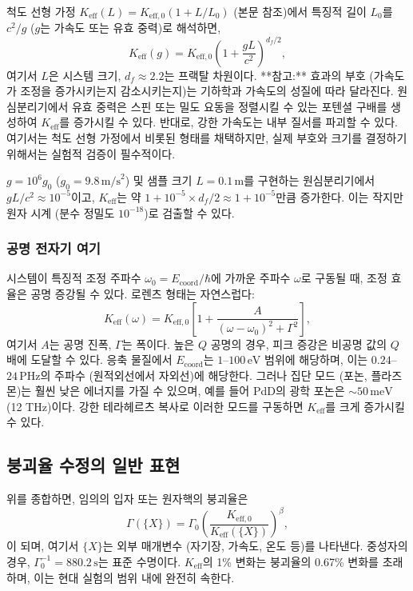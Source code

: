 \documentclass[11pt,a4paper]{article}
\theoremstyle{remark}
\newcommand{\Keff}{K_{\mathrm{eff}}}
\newcommand{\Keffzero}{K_{\mathrm{eff},0}}
\newcommand{\df}{d_{\!f}}
\begin{document}
	척도 선형 가정 \(\Keff(L) = \Keffzero (1 + L/L_0)\) (본문 참조)에서 특징적 길이 \(L_0\)를 \(c^2/g\) (\(g\)는 가속도 또는 유효 중력)로 해석하면,
	\begin{equation}
		\Keff(g) = \Keffzero \left(1 + \frac{gL}{c^2}\right)^{\df/2},
		\label{eq:keff-g}
	\end{equation}
	여기서 \(L\)은 시스템 크기, \(\df \approx 2.2\)는 프랙탈 차원이다. **참고:** 효과의 부호 (가속도가 조정을 증가시키는지 감소시키는지)는 기하학과 가속도의 성질에 따라 달라진다. 원심분리기에서 유효 중력은 스핀 또는 밀도 요동을 정렬시킬 수 있는 포텐셜 구배를 생성하여 \(\Keff\)를 증가시킬 수 있다. 반대로, 강한 가속도는 내부 질서를 파괴할 수 있다. 여기서는 척도 선형 가정에서 비롯된 형태를 채택하지만, 실제 부호와 크기를 결정하기 위해서는 실험적 검증이 필수적이다.
	
	\(g = 10^6g_0\) (\(g_0 = 9.8\,\text{m/s}^2\)) 및 샘플 크기 \(L = 0.1\,\text{m}\)를 구현하는 원심분리기에서 \(gL/c^2 \approx 10^{-5}\)이고, \(\Keff\)는 약 \(1 + 10^{-5}\times\df/2 \approx 1 + 10^{-5}\)만큼 증가한다. 이는 작지만 원자 시계 (분수 정밀도 \(10^{-18}\))로 검출할 수 있다.
	
	\subsubsection{공명 전자기 여기}
	
	시스템이 특징적 조정 주파수 \(\omega_0 = E_{\mathrm{coord}}/\hbar\)에 가까운 주파수 \(\omega\)로 구동될 때, 조정 효율은 공명 증강될 수 있다. 로렌츠 형태는 자연스럽다:
	\begin{equation}
		\Keff(\omega) = \Keffzero \left[ 1 + \frac{A}{(\omega - \omega_0)^2 + \Gamma^2} \right],
		\label{eq:keff-omega}
	\end{equation}
	여기서 \(A\)는 공명 진폭, \(\Gamma\)는 폭이다. 높은 \(Q\) 공명의 경우, 피크 증강은 비공명 값의 \(Q\) 배에 도달할 수 있다. 응축 물질에서 \(E_{\mathrm{coord}}\)는 \(1\)–\(100\,\text{eV}\) 범위에 해당하며, 이는 \(0.24\)–\(24\,\text{PHz}\)의 주파수 (원적외선에서 자외선)에 해당한다. 그러나 집단 모드 (포논, 플라즈몬)는 훨씬 낮은 에너지를 가질 수 있으며, 예를 들어 PdD의 광학 포논은 \(\sim 50\,\text{meV}\) (12 THz)이다. 강한 테라헤르츠 복사로 이러한 모드를 구동하면 \(\Keff\)를 크게 증가시킬 수 있다.
	
	\subsection{붕괴율 수정의 일반 표현}
	
	위를 종합하면, 임의의 입자 또는 원자핵의 붕괴율은
	\begin{equation}
		\Gamma(\{X\}) = \Gamma_0 \left( \frac{\Keffzero}{\Keff(\{X\})} \right)^{\beta},
		\label{eq:general-rate}
	\end{equation}
	이 되며, 여기서 \(\{X\}\)는 외부 매개변수 (자기장, 가속도, 온도 등)를 나타낸다. 중성자의 경우, \(\Gamma_0^{-1} = 880.2\,\text{s}\)는 표준 수명이다. \(\Keff\)의 1\% 변화는 붕괴율의 0.67\% 변화를 초래하며, 이는 현대 실험의 범위 내에 완전히 속한다.
	
\end{document}

